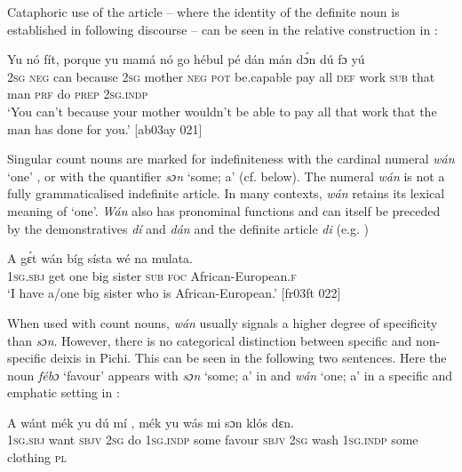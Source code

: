 Cataphoric use of the article – where the identity of the definite noun is established in following discourse – can be seen in the relative construction in : 


\ea%
    \label{ex:key:173}
    \gll Yu  nó  fít,  porque  yu  mamá  nó  go  hébul    pé  
        dán  mán    dɔ́n  dú  fɔ  yú\\
\textsc{2sg}  \textsc{neg}  can  because  \textsc{2sg}  mother  \textsc{neg}  \textsc{pot}  be.capable  pay  all
\textsc{def}  work  \textsc{sub}  that  man    \textsc{prf}  do  \textsc{prep}  \textsc{2sg.indp}\\

\glt ‘You can’t because your mother wouldn’t be able to pay all that work 
that the man has done for you.’ [ab03ay 021]
\z

Singular count nouns are marked for indefiniteness with the cardinal numeral \textit{wán} ‘one’ , or with the quantifier \textit{sɔn} ‘some; a’ (cf.  below). The numeral \textit{wán} is not a fully grammaticalised indefinite article. In many contexts, \textit{wán} retains its lexical meaning of ‘one’. \textit{Wán} also has pronominal functions and can itself be preceded by the demonstratives \textit{dí} and \textit{dán} and the definite article \textit{di} (e.g. )


\ea%
    \label{ex:key:174}
    \gll A    gɛ́t  wán  bíg  sísta  wé  na  mulata.\\
\textsc{1sg.sbj}  get  one  big  sister  \textsc{sub}  \textsc{foc}  African-European.\textsc{f}\\

\glt ‘I have a/one big sister who is African-European.’ [fr03ft 022]
\z

When used with count nouns, \textit{wán} usually signals a higher degree of specificity than \textit{sɔn}. However, there is no categorical distinction between specific and non-specific deixis in Pichi. This can be seen in the following two sentences. Here the noun \textit{fébɔ} ‘favour’ appears with \textit{sɔn} ‘some; a’ in  and \textit{wán} ‘one; a’ in a specific and emphatic setting in : 


\ea%
    \label{ex:key:175}
    \gll A    wánt  mék    yu  dú  mí     ,
mék    yu  wás    mi    sɔn    klós    dɛn.\\
\textsc{1sg.sbj}  want  \textsc{sbjv}    \textsc{2sg}  do  \textsc{1sg.indp}  some  favour
\textsc{sbjv}    \textsc{2sg}  wash  \textsc{1sg.indp}  some  clothing  \textsc{pl}\\

